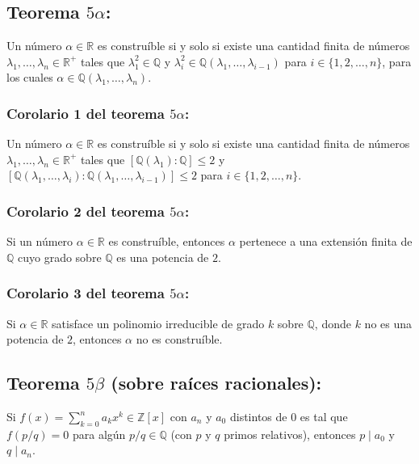 \documentclass{article}
\begin{document}
\subsection*{\color{red} Teorema $5\alpha$:}

Un número $\alpha\in\mathbb{R}$ es construíble si y solo si existe una cantidad finita de números $\lambda_1,\ldots,\lambda_n\in\mathbb{R}^+$ tales que $\lambda_1^2\in\mathbb{Q}$ y $\lambda_i^2\in \mathbb{Q}(\lambda_1,\ldots,\lambda_{i-1})$ para $i\in\{1,2,\ldots,n\}$, para los cuales $\alpha\in \mathbb{Q}(\lambda_1,\ldots,\lambda_n)$.

\subsubsection*{\color{red} Corolario 1 del teorema $5\alpha$:}

Un número $\alpha\in\mathbb{R}$ es construíble si y solo si existe una cantidad finita de números $\lambda_1,\ldots,\lambda_n\in\mathbb{R}^+$ tales que $[\mathbb{Q}(\lambda_1):\mathbb{Q}]\leq2$ y $[\mathbb{Q}(\lambda_1,\ldots,\lambda_{i}):\mathbb{Q}(\lambda_1,\ldots,\lambda_{i-1})]\leq2$ para $i\in\{1,2,\ldots,n\}$.

\subsubsection*{\color{red} Corolario 2 del teorema $5\alpha$:}

Si un número $\alpha\in\mathbb{R}$ es construíble, entonces $\alpha$ pertenece a una extensión finita de $\mathbb{Q}$ cuyo grado sobre $\mathbb{Q}$ es una potencia de $2$.

\subsubsection*{\color{red} Corolario 3 del teorema $5\alpha$:}

Si $\alpha\in\mathbb{R}$ satisface un polinomio irreducible de grado $k$ sobre $\mathbb{Q}$, donde $k$ no es una potencia de $2$, entonces $\alpha$ no es construíble.

\subsection*{\color{red} Teorema $5\beta$ (sobre raíces racionales):}

Si $f(x)=\sum_{k=0}^n a_kx^k\in\mathbb{Z}[x]$ con $a_n$ y $a_0$ distintos de 0 es tal que $f(p/q)=0$ para algún $p/q\in\mathbb{Q}$ (con $p$ y $q$ primos relativos), entonces $p\mid a_0$ y $q\mid a_n$.
\end{document}
